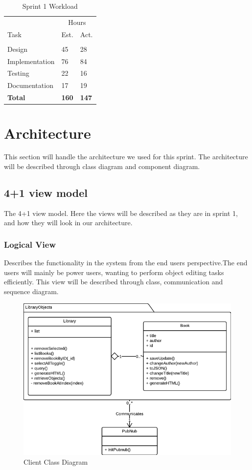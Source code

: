 \begin{table}
\caption{Sprint 1 Workload}
\centering
\begin{tabular}{ l l l }
\hline 
			&\multicolumn{2}{c}{Hours}			\\
 Task		&Est.			&Act.	                               \\ 
\hline \\ [-2.0ex]
Design			&45		&28		\\
Implementation	&76		&84		\\
Testing			&22		&16		\\
Documentation	&17		&19		\\
\hline
\bf{Total}			&\bf{160}	&\bf{147}		\\
\hline
\end{tabular}
\label{table:sp1workload}
\end{table}


\section{Architecture}
This section will handle the architecture we used for this sprint. The architecture will be described through class diagram and component diagram.


\subsection{4+1 view model}
The 4+1 view model\cite{Kruchten}. Here the views will be described as they are in sprint 1, and how they will look in our architecture. 

\subsubsection{Logical View}
Describes the functionality in the system from the end users perspective.The end users will mainly be power users, wanting to perform object editing tasks efficiently. This view will be described through class, communication and sequence diagram.

\begin{figure}[h]
\centering
\includegraphics[width=6in]{image/architecture/s1/s1clientClassDiagram.png}
\caption{Client Class Diagram}
\label{figure:s1clientClassDiagram}
\end{figure}

